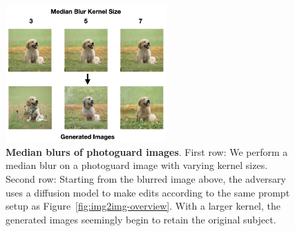 \begin{figure}[h]
\begin{center}
\includegraphics[width=0.55\textwidth]{images/flip-and-blur-figures.003.png}
\end{center}
\caption{\textbf{Median blurs of photoguard images}. First row: We perform a median blur on a photoguard image with varying kernel sizes. Second row: Starting from the blurred image above, the adversary uses a diffusion model to make edits according to the same prompt setup as Figure~\ref{fig:img2img-overview}. With a larger kernel, the generated images seemingly begin to retain the original subject.}
\label{figure-median-blur}
\end{figure}
